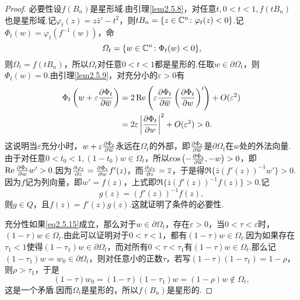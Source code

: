 \begin{proof}
	必要性\quad 设$f(B_n)$是星形域.由引理\ref{lem2.5.8}，对任意$t,0<t<1,f(tB_n)$也是星形域.记$\varphi_t(z)=z\bar{z}'-t^2$，则$tB_n=\{z\in\mathbb C^n\colon\varphi_t(z)<0\}$.记$\Phi_t(w)=\varphi_t(f^{-1}(w))$，命
	\[\varOmega_t=\{w\in\mathbb C^n\colon\Phi_t(w)<0\},\]
	则$\Omega_t=f(tB_n)$，所以$\Omega_t$对任意$0<t<1$都是星形的.任取$w\in\partial\Omega_t$，则$\Phi_t(w)=0$.由引理\ref{lem2.5.9}，对充分小的$\varepsilon>0$有
	\begin{align*}
		\Phi_t\left(w+\varepsilon\frac{\partial \Phi_t}{\partial {}\mkern1mu\overline{\mkern-1muw}}\right)
		&=2\operatorname{Re}\left(\varepsilon\frac{\partial \Phi_t}{\partial {}\mkern1mu\overline{\mkern-1muw}}\left(\frac{\partial \Phi_t}{\partial w}\right)'\right)+O(\varepsilon^2)\\
		&=2\varepsilon\left|\frac{\partial \Phi_t}{\partial w}\right|^2+O(\varepsilon^2)>0.
	\end{align*}
这说明当$\varepsilon$充分小时，$w+\varepsilon\frac{\partial \Phi_t}{\partial {}\mkern1mu\overline{\mkern-1muw}}$永远在$\Omega_t$的外部，即$\frac{\partial \Phi_t}{\partial {}\mkern1mu\overline{\mkern-1muw}}$是$\partial\Omega_t$在$w$处的外法向量.由于对任意$0<t_0<1,(1-t_0)w\in\Omega_t$，所以$\cos\left(-\frac{\partial \Phi_t}{\partial {}\mkern1mu\overline{\mkern-1muw}},-w\right)>0$，即$\operatorname{Re}\frac{\partial \Phi_t}{\partial w}w'>0$.因为$\frac{\partial \varphi_t}{\partial z}=\frac{\partial \Phi_t}{\partial w}f'(z)$，而$\frac{\partial \varphi_t}{\partial z}={}\mkern1mu\overline{\mkern-1muz}$，于是得$\Re\{\bar{z}(f'(z))^{-1}w'\}>0$.因为$f$记为列向量，即$w'=f(z)$，上式即$\Re\{\bar{z}(f'(z))^{-1}f(z)\}>0$.记
\[g(z)=(f'(z))^{-1}f(z),\]
则$g\in Q$，且$f(z)=f'(z)g(z)$.这就证明了条件的必要性.

充分性\quad 如果\eqref{eq2.5.15}成立，那么对于$w\in\partial\Omega_t$，存在$\varepsilon>0$，当$0<\tau<\varepsilon$时，$(1-\tau)w\in\Omega_t$.由此可以证明对于$0<\tau<1$，都有$(1-\tau)w\in\Omega_t$.因为如果存在$\tau_1<1$使得$(1-\tau_1)w\in\partial\Omega_t$，而对所有$0<\tau<\tau_1$有$(1-\tau)w\in\Omega_t$.那么记$(1-\tau_1)w=w_0\in\partial\Omega_t$，则对任意小的正数$\tau$，若写$(1-\tau)(1-\tau_1)=1-\rho$，则$\rho>\tau_1$，于是
\[(1-\tau)w_0=(1-\tau)(1-\tau_1)w=(1-\rho)w\notin\Omega_t,\]
这是一个矛盾.因而$\Omega_t$是星形的，所以$f(B_n)$是星形的.
\end{proof}
